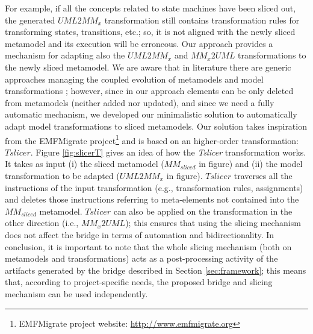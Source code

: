 For example, if all the concepts related to state machines have been sliced out, the generated $UML2MM_x$ transformation still contains
transformation rules for transforming states, transitions, etc.; so, it is not aligned with the newly sliced metamodel and its execution will be erroneous.
Our approach provides a mechanism for adapting also the $UML2MM_x$ and $MM_x2UML$ transformations to the newly sliced metamodel.
We are aware that in literature there are generic approaches managing the coupled evolution of metamodels and model transformations
\cite{TransEvolution}; however, since in our approach elements
can be only deleted from metamodels (neither added nor updated), and since we need a fully automatic mechanism, we developed our minimalistic solution to automatically adapt model transformations to sliced metamodels.
Our solution takes inspiration from the EMFMigrate project\footnote{EMFMigrate project website: \small{\url{http://www.emfmigrate.org}}}
and is based on an higher-order transformation: $Tslicer$.
Figure \ref{fig:slicerT} gives an idea of how the \textit{Tslicer} transformation works. It takes as input (i) the sliced metamodel
($MM_{sliced}$ in figure) and (ii) the model transformation to be adapted ($UML2MM_x$ in figure). 
$Tslicer$ 
traverses all the instructions of the input transformation (e.g., transformation rules, assignments)
and deletes those instructions referring to meta-elements not contained into the $MM_{sliced}$ metamodel.
$Tslicer$ can also be applied on the transformation in the other direction (i.e., $MM_x2UML$); this ensures that using the slicing mechanism does not affect
the bridge in terms of automation and bidirectionality.
In conclusion, it is important to note that the whole slicing mechanism (both on metamodels and transformations)
acts as a post-processing activity of the artifacts generated by the bridge described in Section \ref{sec:framework}; this means that, according to project-specific needs, the proposed bridge and slicing mechanism can be used independently.


